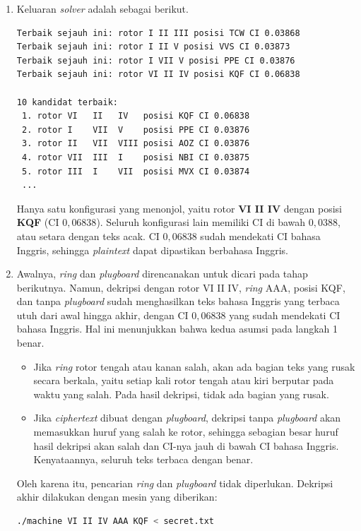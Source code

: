 \begin{enumerate}
  \item Keluaran \textit{solver} adalah sebagai berikut.
\begin{lstlisting}[numbers=none]
Terbaik sejauh ini: rotor I II III posisi TCW CI 0.03868
Terbaik sejauh ini: rotor I II V posisi VVS CI 0.03873
Terbaik sejauh ini: rotor I VII V posisi PPE CI 0.03876
Terbaik sejauh ini: rotor VI II IV posisi KQF CI 0.06838

10 kandidat terbaik:
 1. rotor VI   II   IV   posisi KQF CI 0.06838
 2. rotor I    VII  V    posisi PPE CI 0.03876
 3. rotor II   VII  VIII posisi AOZ CI 0.03876
 4. rotor VII  III  I    posisi NBI CI 0.03875
 5. rotor III  I    VII  posisi MVX CI 0.03874
 ...
\end{lstlisting}
  Hanya satu konfigurasi yang menonjol, yaitu rotor \textbf{VI II IV} dengan posisi \textbf{KQF} (CI
  $0{,}06838$). Seluruh konfigurasi lain memiliki CI di bawah $0{,}0388$, atau setara dengan teks acak.
  CI $0{,}06838$ sudah mendekati CI bahasa Inggris, sehingga \textit{plaintext} dapat dipastikan berbahasa
  Inggris.

  \item Awalnya, \textit{ring} dan \textit{plugboard} direncanakan untuk dicari pada tahap berikutnya. 
  Namun, dekripsi dengan rotor VI II IV, \textit{ring} AAA, posisi KQF, dan tanpa \textit{plugboard} 
  sudah menghasilkan teks bahasa Inggris yang terbaca utuh dari awal hingga akhir, dengan CI $0{,}06838$ 
  yang sudah mendekati CI bahasa Inggris. Hal ini menunjukkan bahwa kedua asumsi pada langkah 1 benar.
  \begin{itemize}[nosep]
    \item Jika \textit{ring} rotor tengah atau kanan salah, akan ada bagian teks yang rusak secara berkala,
    yaitu setiap kali rotor tengah atau kiri berputar pada waktu yang salah. Pada hasil dekripsi, tidak ada
    bagian yang rusak.
    \item Jika \textit{ciphertext} dibuat dengan \textit{plugboard}, dekripsi tanpa \textit{plugboard} akan
    memasukkan huruf yang salah ke rotor, sehingga sebagian besar huruf hasil dekripsi akan salah dan CI-nya
    jauh di bawah CI bahasa Inggris. Kenyataannya, seluruh teks terbaca dengan benar.
  \end{itemize}
  Oleh karena itu, pencarian \textit{ring} dan \textit{plugboard} tidak diperlukan.
  Dekripsi akhir dilakukan dengan mesin yang diberikan:
\begin{lstlisting}[language=bash,numbers=none]
./machine VI II IV AAA KQF < secret.txt
\end{lstlisting}
\end{enumerate}

